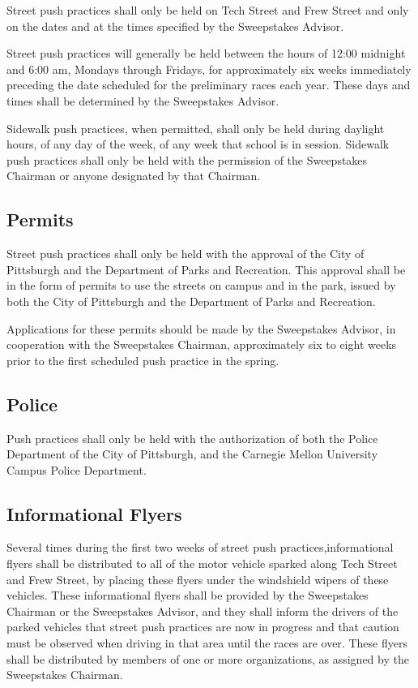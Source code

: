 \documentclass[openany]{book}
\begin{document}
Street push practices shall only be held on Tech Street and Frew Street and only on the dates and at the times specified by the Sweepstakes Advisor.

Street push practices will generally be held between the hours of 12:00 midnight and 6:00 am, Mondays through Fridays, for approximately six weeks immediately preceding the date scheduled for the preliminary races each year. These days and times shall be determined by the Sweepstakes Advisor.

Sidewalk push practices, when permitted, shall only be held during daylight hours, of any day of the week, of any week that school is in session. Sidewalk push practices shall only be held with the permission of the Sweepstakes Chairman or anyone designated by that Chairman.

\subsection{Permits}

Street push practices shall only be held with the approval of the City of Pittsburgh and the Department of Parks and Recreation. This approval shall be in the form of permits to use the streets on campus and in the park, issued by both the City of Pittsburgh and the Department of Parks and Recreation.

Applications for these permits should be made by the Sweepstakes Advisor, in cooperation with the Sweepstakes Chairman, approximately six to eight weeks prior to the first scheduled push practice in the spring.

\subsection{Police}

Push practices shall only be held with the authorization of both the Police Department of the City of Pittsburgh, and the Carnegie Mellon University Campus Police Department.

\subsection{Informational Flyers}

Several times during the first two weeks of street push practices,informational flyers shall be distributed to all of the motor vehicle sparked along Tech Street and Frew Street, by placing these flyers under the windshield wipers of these vehicles. These informational flyers shall be provided by the Sweepstakes Chairman or the Sweepstakes Advisor, and they shall inform the drivers of the parked vehicles that street push practices are now in progress and that caution must be observed when driving in that area until the races are over. These flyers shall be distributed by members of one or more organizations, as assigned by the Sweepstakes Chairman.
\end{document}
